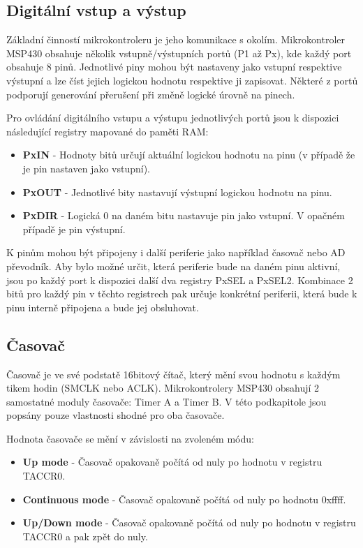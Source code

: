 \subsection{Digitální vstup a výstup}

Základní činností mikrokontroleru je jeho komunikace s okolím. Mikrokontroler MSP430 obsahuje několik vstupně/výstupních portů (P1 až Px), kde každý port obsahuje 8 pinů. Jednotlivé piny mohou být nastaveny jako vstupní respektive výstupní a lze číst jejich logickou hodnotu respektive ji zapisovat. Některé z portů podporují generování přerušení při změně logické úrovně na pinech.

Pro ovládání digitálního vstupu a výstupu jednotlivých portů jsou k dispozici následující registry mapované do paměti RAM:

\begin{itemize}
\item \textbf{PxIN} - Hodnoty bitů určují aktuální logickou hodnotu na pinu (v případě že je pin nastaven jako vstupní).
\item \textbf{PxOUT} - Jednotlivé bity nastavují výstupní logickou hodnotu na pinu.
\item \textbf{PxDIR} - Logická 0 na daném bitu nastavuje pin jako vstupní. V opačném případě je pin výstupní.
\end{itemize}

K pinům mohou být připojeny i další periferie jako například časovač nebo AD převodník. Aby bylo možné určit, která periferie bude na daném pinu aktivní, jsou po každý port k dispozici další dva registry PxSEL a PxSEL2. Kombinace 2 bitů pro každý pin v těchto registrech pak určuje konkrétní periferii, která
bude k pinu interně připojena a bude jej obsluhovat.

\subsection{Časovač}

Časovač je ve své podstatě 16bitový čítač, který mění svou hodnotu s každým tikem hodin (SMCLK nebo ACLK). Mikrokontrolery MSP430 obsahují 2 samostatné moduly časovače: Timer A a Timer B. V této podkapitole jsou popsány pouze vlastnosti shodné pro oba časovače.

Hodnota časovače se mění v závislosti na zvoleném módu:
\begin{itemize}
\item \textbf{Up mode} - Časovač opakovaně počítá od nuly po hodnotu v registru TACCR0.
\item \textbf{Continuous mode} - Časovač opakovaně počítá od nuly po hodnotu 0xffff.
\item \textbf{Up/Down mode} - Časovač opakovaně počítá od nuly po hodnotu v registru TACCR0 a pak zpět do nuly.
\end{itemize}

